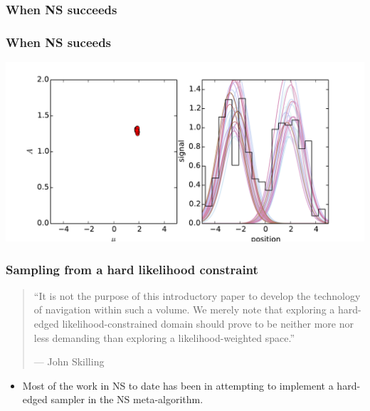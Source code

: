 \documentclass[]{beamer}
\begin{document}
\begin{frame}
  \frametitle{When NS succeeds} 
\end{frame}
\begin{frame}
  \frametitle{When NS suceeds} 
  \includegraphics[width=\textwidth]{movies/NS_multimodal_1.pdf}
\end{frame}


\begin{frame}
  \frametitle{Sampling from a hard likelihood constraint} 

  \pause
  \begin{quote}
    ``It is not the purpose of this introductory paper to develop the technology of navigation within such a volume. We merely note that exploring a hard-edged likelihood-constrained domain should prove to be neither more nor less demanding than exploring a likelihood-weighted space.''
    
   {\hfill --- John Skilling}
  \end{quote}

  \begin{itemize}
      \pause
    \item Most of the work in NS to date has been in attempting to implement a hard-edged sampler in the NS meta-algorithm.
  \end{itemize}
 
\end{frame}
\end{document}
